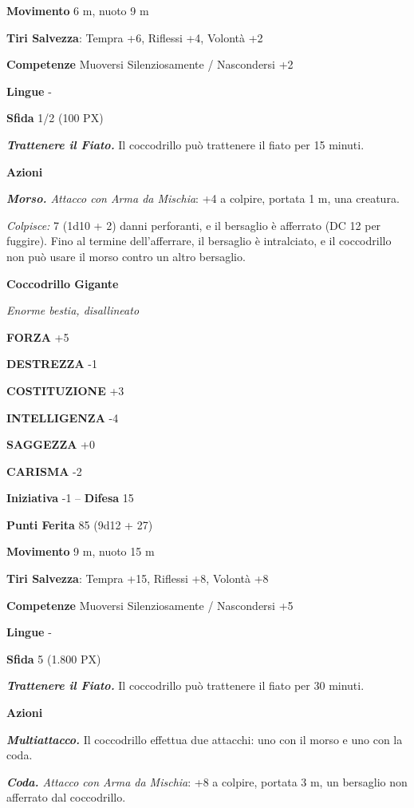 \begin{multicols}{2}
	\textbf{Movimento} 6 m, nuoto 9 m

	\textbf{Tiri Salvezza}: Tempra +6, Riflessi +4, Volontà +2

	\textbf{Competenze} Muoversi Silenziosamente / Nascondersi +2

	\textbf{Lingue} -

	\textbf{Sfida} 1/2 (100 PX)

	\textit{\textbf{Trattenere il Fiato.}} Il coccodrillo può trattenere il fiato per 15 minuti.

	\textbf{Azioni}

	\textit{\textbf{Morso.} Attacco con Arma da Mischia}: +4 a colpire, portata 1 m, una creatura.

	\textit{Colpisce:} 7 (1d10 + 2) danni perforanti, e il bersaglio è afferrato (DC 12 per fuggire). Fino al termine dell'afferrare, il bersaglio è intralciato, e il coccodrillo non può usare il morso contro un altro bersaglio.

	\medskip\textbf{Coccodrillo Gigante}

	\textit{Enorme bestia, disallineato}

	\textbf{FORZA} +5

	\textbf{DESTREZZA} -1

	\textbf{COSTITUZIONE} +3

	\textbf{INTELLIGENZA} -4

	\textbf{SAGGEZZA} +0

	\textbf{CARISMA} -2

	\textbf{Iniziativa} -1 -- \textbf{Difesa} 15

	\textbf{Punti Ferita} 85 (9d12 + 27)

	\textbf{Movimento} 9 m, nuoto 15 m

	\textbf{Tiri Salvezza}: Tempra +15, Riflessi +8, Volontà +8

	\textbf{Competenze} Muoversi Silenziosamente / Nascondersi +5

	\textbf{Lingue} -

	\textbf{Sfida} 5 (1.800 PX)

	\textit{\textbf{Trattenere il Fiato.}} Il coccodrillo può trattenere il fiato per 30 minuti.

	\textbf{Azioni}

	\textit{\textbf{Multiattacco.}} Il coccodrillo effettua due attacchi: uno con il morso e uno con la coda.

	\textit{\textbf{Coda.} Attacco con Arma da Mischia}: +8 a colpire, portata 3 m, un bersaglio non afferrato dal coccodrillo.


\end{multicols}

